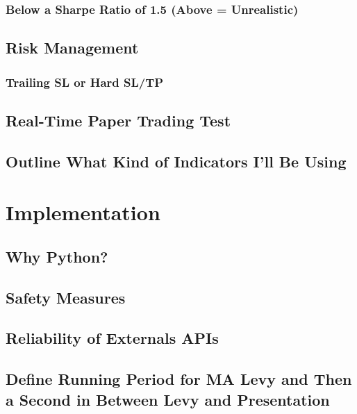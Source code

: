 \documentclass{article}
\begin{document}
\subsubsection{Below a Sharpe Ratio of 1.5 (Above = Unrealistic)}
\subsection{Risk Management}
\subsubsection{Trailing SL or Hard SL/TP}
\subsection{Real-Time Paper Trading Test}
\subsection{Outline What Kind of Indicators I'll Be Using}

\section{Implementation}
\subsection{Why Python?}
\subsection{Safety Measures}
\subsection{Reliability of Externals APIs}
\subsection{Define Running Period for MA Levy and Then a Second in Between Levy and Presentation}
\end{document}
